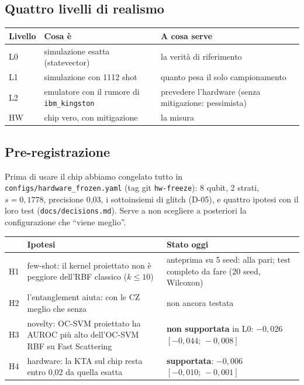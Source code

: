 \subsection{Quattro livelli di realismo}
\begin{center}
\begin{tabularx}{\textwidth}{@{}l>{\raggedright\arraybackslash}X>{\raggedright\arraybackslash}X@{}}
\toprule
Livello & Cosa è & A cosa serve\\
\midrule
L0 & simulazione esatta (statevector) & la verità di riferimento\\
L1 & simulazione con 1112 shot & quanto pesa il solo campionamento\\
L2 & emulatore con il rumore di \texttt{ibm\_kingston} & prevedere l’hardware (senza mitigazione: pessimista)\\
HW & chip vero, con mitigazione & la misura\\
\bottomrule
\end{tabularx}
\end{center}

\subsection{Pre-registrazione}
Prima di usare il chip abbiamo congelato tutto in \texttt{configs/hardware\_frozen.yaml} (tag git \texttt{hw-freeze}):
8 qubit, 2 strati, $s=0{,}1778$, precisione 0,03, i sottoinsiemi di glitch (D-05), e quattro ipotesi con il loro test
(\texttt{docs/decisions.md}). Serve a non scegliere a posteriori la configurazione che “viene meglio”.

\begin{center}
\begin{tabularx}{\textwidth}{@{}l>{\raggedright\arraybackslash}X>{\raggedright\arraybackslash}p{4.3cm}@{}}
\toprule
& Ipotesi & Stato oggi\\
\midrule
H1 & few-shot: il kernel proiettato non è peggiore dell’RBF classico ($k\leq10$) & anteprima su 5 seed: alla pari; test completo da fare (20 seed, Wilcoxon)\\
H2 & l’entanglement aiuta: con le CZ meglio che senza & non ancora testata\\
H3 & novelty: OC-SVM proiettato ha AUROC più alto dell’OC-SVM RBF su Fast Scattering & \textbf{non supportata} in L0: $-0{,}026$ $[-0{,}044;\,-0{,}008]$\\
H4 & hardware: la KTA sul chip resta entro 0,02 da quella esatta & \textbf{supportata}: $-0{,}006$ $[-0{,}010;\,-0{,}001]$\\
\bottomrule
\end{tabularx}
\end{center}

